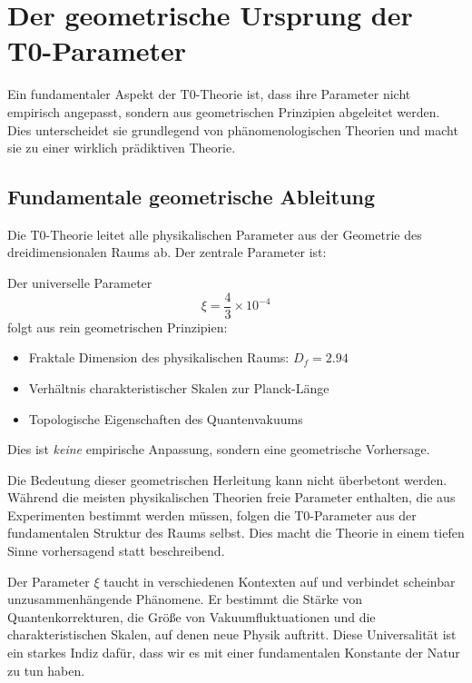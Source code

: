 	\section{Der geometrische Ursprung der T0-Parameter}
	
	Ein fundamentaler Aspekt der T0-Theorie ist, dass ihre Parameter nicht empirisch angepasst, sondern aus geometrischen Prinzipien abgeleitet werden. Dies unterscheidet sie grundlegend von phänomenologischen Theorien und macht sie zu einer wirklich prädiktiven Theorie.
	
	\subsection{Fundamentale geometrische Ableitung}
	
	Die T0-Theorie leitet alle physikalischen Parameter aus der Geometrie des dreidimensionalen Raums ab. Der zentrale Parameter ist:
	
	\begin{tcolorbox}[colback=t0blue!5!white, colframe=t0blue!75!black, title=T0-Vorhersage]
		Der universelle Parameter
		\begin{equation}
			\xi = \frac{4}{3} \times 10^{-4}
		\end{equation}
		folgt aus rein geometrischen Prinzipien:
		\begin{itemize}
			\item Fraktale Dimension des physikalischen Raums: $D_f = 2.94$
			\item Verhältnis charakteristischer Skalen zur Planck-Länge
			\item Topologische Eigenschaften des Quantenvakuums
		\end{itemize}
		Dies ist \emph{keine} empirische Anpassung, sondern eine geometrische Vorhersage.
	\end{tcolorbox}
	
	Die Bedeutung dieser geometrischen Herleitung kann nicht überbetont werden. Während die meisten physikalischen Theorien freie Parameter enthalten, die aus Experimenten bestimmt werden müssen, folgen die T0-Parameter aus der fundamentalen Struktur des Raums selbst. Dies macht die Theorie in einem tiefen Sinne vorhersagend statt beschreibend.
	
	Der Parameter $\xi$ taucht in verschiedenen Kontexten auf und verbindet scheinbar unzusammenhängende Phänomene. Er bestimmt die Stärke von Quantenkorrekturen, die Größe von Vakuumfluktuationen und die charakteristischen Skalen, auf denen neue Physik auftritt. Diese Universalität ist ein starkes Indiz dafür, dass wir es mit einer fundamentalen Konstante der Natur zu tun haben.
	
